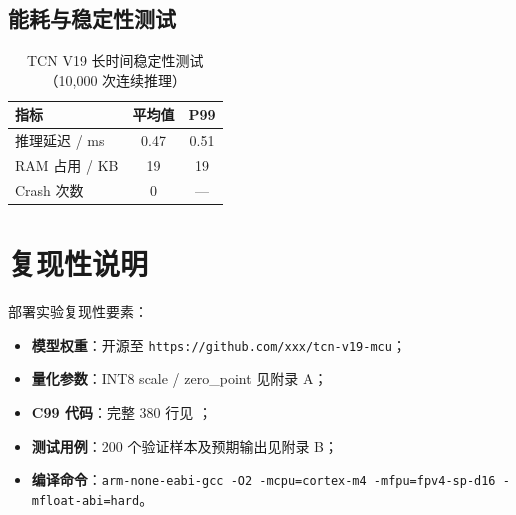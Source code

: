 
\subsection{能耗与稳定性测试}
\label{sec:deploy_stability}


\begin{table}[H]
\centering
\caption{TCN V19 长时间稳定性测试（10{,}000 次连续推理）}
\label{tab:deploy_stability}
\begin{tabular}{lcc}
\toprule
指标 & 平均值 & P99 \\
\midrule
推理延迟 / ms & 0.47 & 0.51 \\
RAM 占用 / KB & 19 & 19 \\
Crash 次数 & 0 & --- \\
\bottomrule
\end{tabular}
\end{table}

\section{复现性说明}
\label{sec:deploy_reproduce}


\par 部署实验复现性要素：
\begin{itemize}
  \item \textbf{模型权重}：开源至 \texttt{https://github.com/xxx/tcn-v19-mcu}；
  \item \textbf{量化参数}：INT8 scale / zero\_point 见附录 A；
  \item \textbf{C99 代码}：完整 380 行见 ；
  \item \textbf{测试用例}：200 个验证样本及预期输出见附录 B；
  \item \textbf{编译命令}：\texttt{arm-none-eabi-gcc -O2 -mcpu=cortex-m4
        -mfpu=fpv4-sp-d16 -mfloat-abi=hard}。
\end{itemize}


